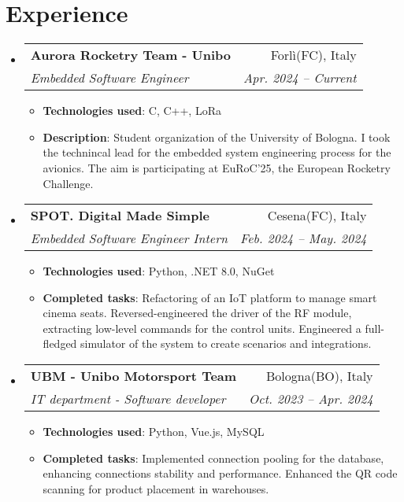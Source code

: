 \documentclass[letterpaper,11pt]{article}
\makeatletter
\newcommand{\resumeItem}[2]{
  \item\small{
    \textbf{#1}{: #2 \vspace{-2pt}}
  }
}
\newcommand{\resumeSubheading}[4]{
  \vspace{-1pt}\item
    \begin{tabular*}{0.97\textwidth}{l@{\extracolsep{\fill}}r}
      \textbf{#1} & #2 \\
      \textit{\small#3} & \textit{\small #4} \\
    \end{tabular*}\vspace{-5pt}
}
\newcommand{\resumeSubHeadingListStart}{\begin{itemize}[leftmargin=*]}
\newcommand{\resumeSubHeadingListEnd}{\end{itemize}}
\newcommand{\resumeItemListStart}{\begin{itemize}}
\newcommand{\resumeItemListEnd}{\end{itemize}\vspace{-5pt}}
\makeatother
\begin{document}
\section{Experience}
\resumeSubHeadingListStart
    \resumeSubheading{Aurora Rocketry Team - Unibo}{Forlì(FC), Italy}{Embedded Software Engineer}{Apr. 2024 -- Current}
    \resumeItemListStart
        \resumeItem{Technologies used} {C, C++, LoRa}
        \resumeItem{Description}
        {Student organization of the University of Bologna.
	        I took the technincal lead for the embedded system engineering process for the avionics.
	        The aim is participating at EuRoC'25, the European Rocketry Challenge.}
    \resumeItemListEnd
    \resumeSubheading{SPOT. Digital Made Simple}{Cesena(FC), Italy}{Embedded Software Engineer Intern}{Feb. 2024 -- May. 2024}
    \resumeItemListStart
        \resumeItem{Technologies used} {Python, .NET 8.0, NuGet}
        \resumeItem{Completed tasks}
        {Refactoring of an IoT platform to manage smart cinema seats.
          Reversed-engineered the driver of the RF module, extracting low-level commands for the control units.
          Engineered a full-fledged simulator of the system to create scenarios and integrations.}
    \resumeItemListEnd
    \resumeSubheading{UBM - Unibo Motorsport Team}{Bologna(BO), Italy}{IT department - Software developer}{Oct. 2023 -- Apr. 2024}
    \resumeItemListStart
        \resumeItem{Technologies used} {Python, Vue.js, MySQL}
        \resumeItem{Completed tasks}
        {Implemented connection pooling for the database, enhancing connections stability and performance. Enhanced the QR code scanning for product placement in warehouses.}
    \resumeItemListEnd
\resumeSubHeadingListEnd

\begin{comment}    
    \resumeSubheading
      {UBM - Unibo Motorsport Team}{Bologna, Italy}
      {Software developer}{Oct. 2023 - Current}
      \resumeItemListStart
        \resumeItem{Python}
          {I improved the back-end of the application, implementing new features, 
            documenting the code and fixing bugs.
            In particular:}
            \resumeItemListStart
                \resumeItem{Connection pooling}
                    {I implemented a connection pool to the database, to avoid the overhead of creating a new connection every time a request is made.}
            \resumeItemListEnd
      \resumeItemListEnd

  
    \resumeSubheading
      {Other Company}{Location}
      {Position}{From - To}
      \resumeItemListStart
        \resumeItem{Technology you worked with/on}
          {Description}
        \resumeItem{Other technology you worked with/on}
          {Description}
      \resumeItemListEnd

    \resumeSubheading
      {Research Position}{Location}
      {Position}{From - To}
      \resumeItemListStart
        \resumeItem{Technology you worked with/on}
          {Description}
        \resumeItem{Other technology you worked with/on}
          {Description}
      \resumeItemListEnd
\end{comment}
\end{document}
